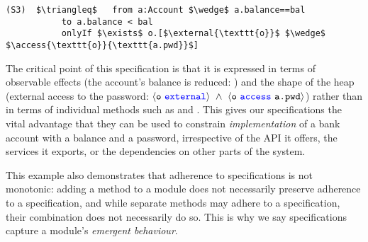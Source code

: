 %
%
%
%
%
%
\begin{lstlisting}[language = Chainmail, mathescape=true, frame=lines]
(S3)  $\triangleq$   from a:Account $\wedge$ a.balance==bal
           to a.balance < bal
           onlyIf $\exists$ o.[$\external{\texttt{o}}$ $\wedge$ $\access{\texttt{o}}{\texttt{a.pwd}}$]
\end{lstlisting}
%
%
% 
The critical point of this \Nec specification is that it is
expressed in terms of observable effects (the account's balance is
reduced: ) and the shape of the heap 
(external access to the password:
$\external{\prg{o}}\ \wedge\ \access{\prg{o}}{\prg{a.pwd}}$) 
rather than in terms of individual methods such as
 and .
This gives our specifications the
vital advantage that they can be used to constrain
\textit{implementation} of a bank account with a balance and a
password, irrespective of the API it
offers, the services it exports, or the dependencies on other parts of
the system.

{This example also demonstrates that 
adherence to   \Nec specifications is not monotonic:
adding a method to a module does not necessarily preserve adherence to
a specification, 
and while separate methods may adhere to a  specification, their combination does
not necessarily do so. This is why we say \Nec specifications capture a module's \emph{emergent behaviour}. 
}

